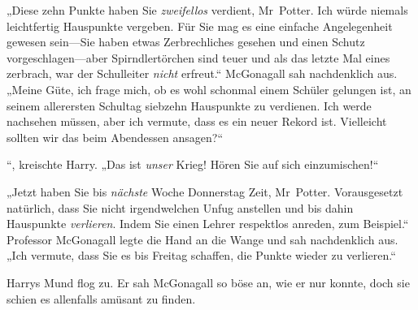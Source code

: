 „Diese zehn Punkte haben Sie \emph{zweifellos} verdient, Mr~Potter. Ich würde niemals leichtfertig Hauspunkte vergeben. Für Sie mag es eine einfache Angelegenheit gewesen sein—Sie haben etwas Zerbrechliches gesehen und einen Schutz vorgeschlagen—aber Spirndlertörchen sind teuer und als das letzte Mal eines zerbrach, war der Schulleiter \emph{nicht} erfreut.“ McGonagall sah nachdenklich aus. „Meine Güte, ich frage mich, ob es wohl schonmal einem Schüler gelungen ist, an seinem allerersten Schultag siebzehn Hauspunkte zu verdienen. Ich werde nachsehen müssen, aber ich vermute, dass es ein neuer Rekord ist. Vielleicht sollten wir das beim Abendessen ansagen?“

“, kreischte Harry. „Das ist \emph{unser} Krieg! Hören Sie auf sich einzumischen!“

„Jetzt haben Sie bis \emph{nächste} Woche Donnerstag Zeit, Mr~Potter. Vorausgesetzt natürlich, dass Sie nicht irgendwelchen Unfug anstellen und bis dahin Hauspunkte \emph{verlieren}. Indem Sie einen Lehrer respektlos anreden, zum Beispiel.“ Professor McGonagall legte die Hand an die Wange und sah nachdenklich aus. „Ich vermute, dass Sie es bis Freitag schaffen, die Punkte wieder zu verlieren.“

Harrys Mund flog zu. Er sah McGonagall so böse an, wie er nur konnte, doch sie schien es allenfalls amüsant zu finden.

